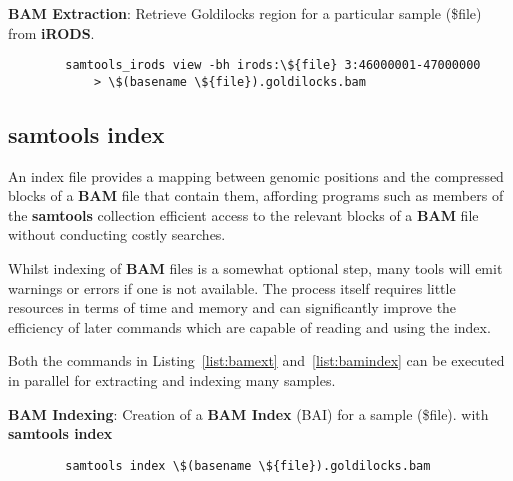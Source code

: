 \begin{listing}[H]
    \caption[bamext]{\textbf{BAM Extraction}: Retrieve Goldilocks region for
        a particular sample (\$file) from \textbf{iRODS}.}
    \label{list:bamext}
    \begin{verbatim}
        samtools_irods view -bh irods:\${file} 3:46000001-47000000
            > \$(basename \${file}).goldilocks.bam
    \end{verbatim}
\end{listing}


\subsection{samtools index}

An index file provides a mapping between genomic positions and the compressed
blocks of a \textbf{BAM} file that contain them, affording programs such as
members of the \textbf{samtools} collection efficient access to the relevant
blocks of a \textbf{BAM} file without conducting costly searches.

Whilst indexing of \textbf{BAM} files is a somewhat optional step, many tools
will emit warnings or errors if one is not available. The process itself
requires little resources in terms of time and memory and can significantly
improve the efficiency of later commands which are capable of reading and using
the index.

Both the commands in Listing~\ref{list:bamext} and~\ref{list:bamindex} can
be executed in parallel for extracting and indexing many samples.

\begin{listing}[H]
    \caption[bamindex]{\textbf{BAM Indexing}: Creation of a \textbf{BAM Index} (BAI)
        for a sample (\$file). with \textbf{samtools
    index}\citep{man:samtools}}
    \label{list:bamindex}
    \begin{verbatim}
        samtools index \$(basename \${file}).goldilocks.bam
    \end{verbatim}
\end{listing}



